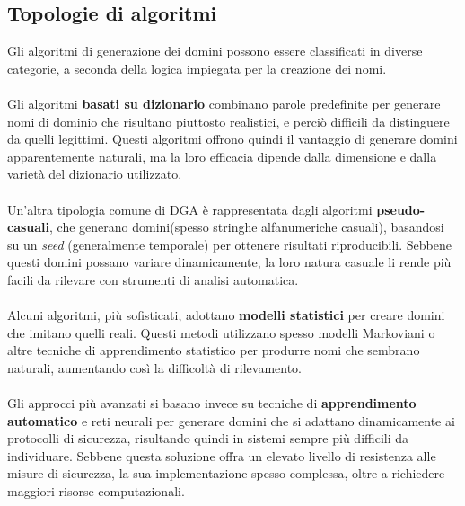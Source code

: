 \subsection*{Topologie di algoritmi}
Gli algoritmi di generazione dei domini possono essere classificati in diverse 
categorie, a seconda della logica impiegata per la creazione dei nomi. 
\\\\
Gli algoritmi \textbf{basati su dizionario} combinano parole predefinite per 
generare nomi di dominio che risultano piuttosto realistici, e perciò 
difficili da distinguere da quelli legittimi. Questi algoritmi offrono
quindi il vantaggio di generare domini apparentemente naturali, ma la
loro efficacia dipende dalla dimensione e dalla varietà del dizionario utilizzato. 
\\\\
Un'altra tipologia comune di DGA è rappresentata dagli algoritmi \textbf{pseudo-casuali}, 
che generano domini(spesso stringhe alfanumeriche casuali), basandosi su 
un \textit{seed} (generalmente temporale) per ottenere risultati 
riproducibili. Sebbene questi domini possano variare dinamicamente, 
la loro natura casuale li rende più facili da 
rilevare con strumenti di analisi automatica.
\\\\
Alcuni algoritmi, più sofisticati, adottano \textbf{modelli statistici}
per creare domini che imitano quelli reali. Questi metodi utilizzano 
spesso modelli Markoviani o altre tecniche di apprendimento statistico 
per produrre nomi che sembrano naturali, aumentando così la difficoltà 
di rilevamento. 
\\\\
Gli approcci più avanzati si basano invece su tecniche di 
\textbf{apprendimento automatico} e reti neurali per generare 
domini che si adattano dinamicamente ai protocolli di 
sicurezza, risultando quindi in sistemi sempre più difficili da individuare. 
Sebbene questa soluzione offra un elevato livello di
resistenza alle misure di sicurezza, la sua implementazione spesso complessa, oltre a 
richiedere maggiori risorse computazionali.